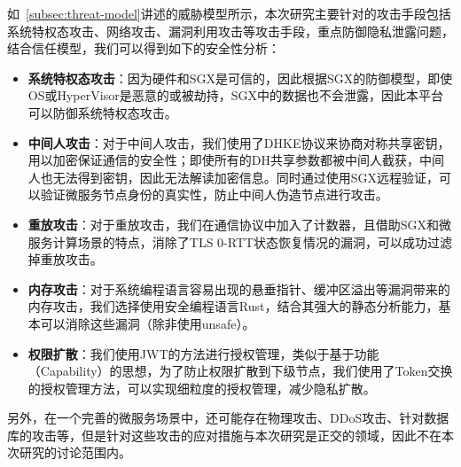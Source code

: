 如~\cref{subsec:threat-model}讲述的威胁模型所示，本次研究主要针对的攻击手段包括系统特权态攻击、网络攻击、漏洞利用攻击等攻击手段，重点防御隐私泄露问题，结合信任模型，我们可以得到如下的安全性分析：

\begin{itemize}
    \item \textbf{系统特权态攻击}：因为硬件和SGX是可信的，因此根据SGX的防御模型，即使OS或HyperVisor是恶意的或被劫持，SGX中的数据也不会泄露，因此本平台可以防御系统特权态攻击。
    \item \textbf{中间人攻击}：对于中间人攻击，我们使用了DHKE协议来协商对称共享密钥，用以加密保证通信的安全性；即使所有的DH共享参数都被中间人截获，中间人也无法得到密钥，因此无法解读加密信息。同时通过使用SGX远程验证，可以验证微服务节点身份的真实性，防止中间人伪造节点进行攻击。
    \item \textbf{重放攻击}：对于重放攻击，我们在通信协议中加入了计数器，且借助SGX和微服务计算场景的特点，消除了TLS 0-RTT状态恢复情况的漏洞，可以成功过滤掉重放攻击。
    \item \textbf{内存攻击}：对于系统编程语言容易出现的悬垂指针、缓冲区溢出等漏洞带来的内存攻击，我们选择使用安全编程语言Rust，结合其强大的静态分析能力，基本可以消除这些漏洞（除非使用unsafe）。
    \item \textbf{权限扩散}：我们使用JWT的方法进行授权管理，类似于基于功能（Capability）的思想，为了防止权限扩散到下级节点，我们使用了Token交换的授权管理方法，可以实现细粒度的授权管理，减少隐私扩散。
\end{itemize}

另外，在一个完善的微服务场景中，还可能存在物理攻击、DDoS攻击、针对数据库的攻击等，但是针对这些攻击的应对措施与本次研究是正交的领域，因此不在本次研究的讨论范围内。
